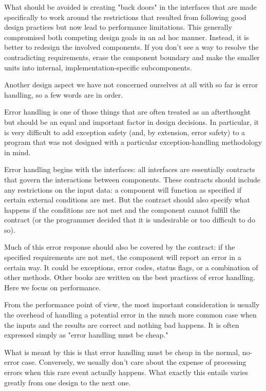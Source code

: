 What should be avoided is creating "back doors" in the interfaces that are made specifically to work around the restrictions that resulted from following good design practices but now lead to performance limitations. This generally compromised both competing design goals in an ad hoc manner. Instead, it is better to redesign the involved components. If you don't see a way to resolve the contradicting requirements, erase the component boundary and make the smaller units into internal, implementation-specific subcomponents.

Another design aspect we have not concerned ourselves at all with so far is error handling, so a few words are in order.


Error handling is one of those things that are often treated as an afterthought but should be an equal and important factor in design decisions. In particular, it is very difficult to add exception safety (and, by extension, error safety) to a program that was not designed with a particular exception-handling methodology in mind.

Error handling begins with the interfaces: all interfaces are essentially contracts that govern the interactions between components. These contracts should include any restrictions on the input data: a component will function as specified if certain external conditions are met. But the contract should also specify what happens if the conditions are not met and the component cannot fulfill the contract (or the programmer decided that it is undesirable or too difficult to do so). 

Much of this error response should also be covered by the contract: if the specified requirements are not met, the component will report an error in a certain way. It could be exceptions, error codes, status flags, or a combination of other methods. Other books are written on the best practices of error handling. Here we focus on performance.

From the performance point of view, the most important consideration is usually the overhead of handling a potential error in the much more common case when the inputs and the results are correct and nothing bad happens. It is often expressed simply as "error handling must be cheap."

What is meant by this is that error handling must be cheap in the normal, no-error case. Conversely, we usually don't care about the expense of processing errors when this rare event actually happens. What exactly this entails varies greatly from one design to the next one. 


